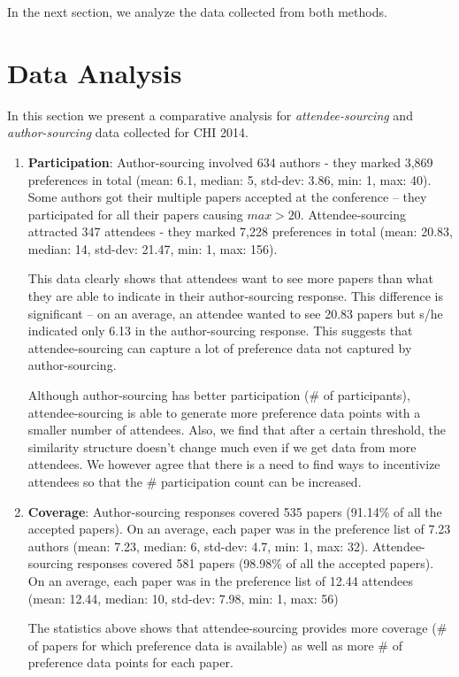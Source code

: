 \documentclass[letterpaper]{article}
\begin{document}
In the next section, we analyze the data collected from both methods.
\section{Data Analysis}
In this section we present a comparative analysis for \emph{attendee-sourcing} and \emph{author-sourcing} data collected for CHI 2014. 
\begin{enumerate}
\item \textbf{Participation}: Author-sourcing involved 634 authors - they marked 3,869 preferences in total (mean: 6.1, median: 5, std-dev: 3.86, min: 1, max: 40). Some authors got their multiple papers accepted at the conference -- they participated for all their papers causing  $max > 20$. Attendee-sourcing attracted 347 attendees - they marked 7,228 preferences in total (mean: 20.83, median: 14, std-dev: 21.47, min: 1, max: 156).

This data clearly shows that attendees want to see more papers than what they are able to indicate in their author-sourcing response. This difference is significant -- on an average, an attendee wanted to see 20.83 papers but s/he indicated only 6.13 in the author-sourcing response. This suggests that attendee-sourcing can capture a lot of preference data not captured by author-sourcing.

Although author-sourcing has better participation (\# of participants), attendee-sourcing is able to generate more preference data points with a smaller number of attendees. Also, we find that after a certain threshold, the similarity structure doesn't change much even if we get data from more attendees. We however agree that there is a need to find ways to incentivize attendees so that the \# participation count can be increased.

\item \textbf{Coverage}: Author-sourcing responses covered 535 papers (91.14\% of all the accepted papers). On an average, each paper was in the preference list of 7.23 authors (mean: 7.23, median: 6, std-dev: 4.7, min: 1, max: 32). Attendee-sourcing responses covered 581 papers (98.98\% of all the accepted papers). On an average, each paper was in the preference list of 12.44 attendees (mean: 12.44, median: 10, std-dev: 7.98, min: 1, max: 56)

The statistics above shows that attendee-sourcing provides more coverage (\# of papers for which preference data is available) as well as more \# of preference data points for each paper.


\end{enumerate}
\end{document}
